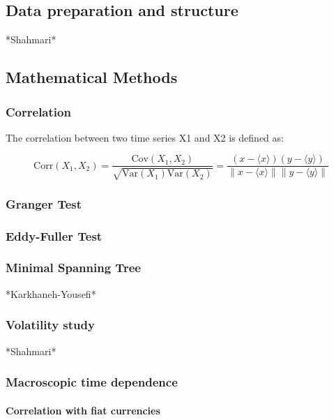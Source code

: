 \documentclass[fleqn,10pt]{SelfArx} %
\begin{document}
\subsection{Data preparation and structure}

*Shahmari*

\subsection{Mathematical Methods}

\subsubsection{Correlation}

The correlation between two time series X1 and X2 is defined as:

\begin{equation}
	\mathrm{Corr}(X_1, X_2) = \frac{\mathrm{Cov}(X_1, X_2)}{\sqrt{\mathrm{Var}(X_1)\mathrm{Var}(X_2)}} = \frac{(x-\langle x\rangle)(y-\langle y\rangle)}{\|x-\langle x\rangle\|\|y-\langle y\rangle\|}
	\label{eq:refname2}
\end{equation}

\subsubsection{Granger Test}

\subsubsection{Eddy-Fuller Test}

\subsubsection{Minimal Spanning Tree}

*Karkhaneh-Yousefi*

\subsubsection{Volatility study}

*Shahmari*

\subsubsection{Macroscopic time dependence}

\paragraph{Correlation with fiat currencies}
\end{document}
